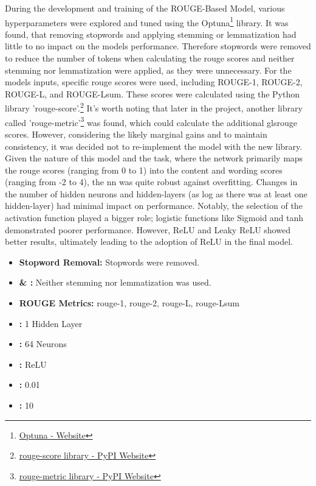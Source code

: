 During the development and training of the ROUGE-Based Model, various hyperparameters were explored and tuned using the Optuna\footnote{\href{https://optuna.org/}{Optuna - Website}} library. It was found, that removing stopwords and applying \gls{stemming} or \gls{lemmatization} had little to no impact on the models performance. Therefore stopwords were removed to reduce the number of \glspl{token} when calculating the \gls{rouge} scores and neither stemming nor lemmatization were applied, as they were unnecessary. For the models inputs, specific \gls{rouge} scores were used, including ROUGE-1, ROUGE-2, ROUGE-L, and ROUGE-Lsum. These scores were calculated using the Python library 'rouge-score'.\footnote{\href{https://pypi.org/project/rouge-score/}{rouge-score library - PyPI Website}}
It's worth noting that later in the project, another library called 'rouge-metric'\footnote{\href{https://pypi.org/project/rouge-metric/}{rouge-metric library - PyPI Website}}
was found, which could calculate the additional gls{rouge} scores. However, considering the likely marginal gains and to maintain consistency, it was decided not to re-implement the model with the new library.\\
Given the nature of this model and the task, where the network primarily maps the \gls{rouge} scores (ranging from 0 to 1) into the content and wording scores (ranging from -2 to 4), the \gls{nn} was quite robust against overfitting. Changes in the number of hidden neurons and \glspl{hidden-layer} (as log as there was at least one \gls{hidden-layer}) had minimal impact on performance. Notably, the selection of the \gls{activation function} played a bigger role; logistic functions like Sigmoid and tanh demonstrated poorer performance. However, ReLU and Leaky ReLU showed better results, ultimately leading to the adoption of ReLU in the final model.

\begin{itemize}
    \item \textbf{Stopword Removal:} Stopwords were removed.
    \item \textbf{ \& :} Neither \gls{stemming} nor \gls{lemmatization} was used.
    \item \textbf{ROUGE Metrics:} \gls{rouge}-1, \gls{rouge}-2, \gls{rouge}-L, \gls{rouge}-Lsum
    \item \textbf{:} 1 Hidden Layer
    \item \textbf{:} 64 Neurons
    \item \textbf{:} ReLU
    \item \textbf{:} 0.01
    \item \textbf{:} 10
\end{itemize}

